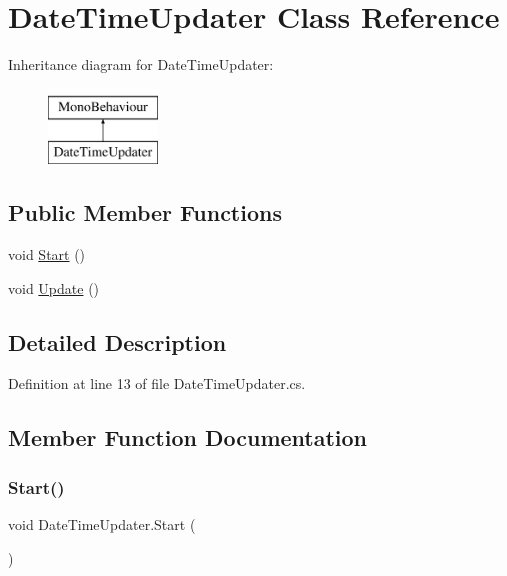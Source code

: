 \hypertarget{class_date_time_updater}{}\section{Date\+Time\+Updater Class Reference}
\label{class_date_time_updater}
Inheritance diagram for Date\+Time\+Updater\+:\begin{figure}[H]
\begin{center}
\leavevmode
\includegraphics[height=2.000000cm]{class_date_time_updater}
\end{center}
\end{figure}
\subsection*{Public Member Functions}
\begin{DoxyCompactItemize}
\item 
void \hyperlink{class_date_time_updater_a9f5d4e41f7825a62419d1bca04b9c9ad}{Start} ()
\item 
void \hyperlink{class_date_time_updater_a74fd4bc0faae063f9aedb141f2951549}{Update} ()
\end{DoxyCompactItemize}


\subsection{Detailed Description}


Definition at line 13 of file Date\+Time\+Updater.\+cs.



\subsection{Member Function Documentation}
\mbox{\label{class_date_time_updater_a9f5d4e41f7825a62419d1bca04b9c9ad}} 
\subsubsection{\texorpdfstring{Start()}{Start()}}
{\footnotesize\ttfamily void Date\+Time\+Updater.\+Start (\begin{DoxyParamCaption}{ }\end{DoxyParamCaption})}



